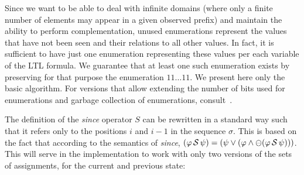 %

Since we want to be able to deal with infinite domains
(where only a finite number of elements may appear in a given observed prefix) and maintain the ability to perform
complementation, unused enumerations represent the
values that have not been seen and their relations
to all other values. 
In fact, it is sufficient to have just one enumeration representing these values per each variable of the LTL formula. 
We guarantee that at least one such enumeration exists by preserving for that purpose the enumeration $11\ldots11$.
We present here only the basic algorithm. For versions that
allow extending the number of bits used for enumerations and garbage collection of enumerations, consult~\cite{HP}.

\iffalse %
The definition of the {\em since} operator $S$ can be rewritten in a standard
way such that it refers only to the positions $i$ and $i-1$ in
the sequence $\sigma$. 
This is based on the
fact that according to the semantics of {\em since},
$(\varphi \, {\cal S} \, \psi) = ( \psi \vee (\varphi \wedge \ominus 
(\varphi \, {\cal S} \, \psi )))$.
This will serve in the
implementation to work with only two versions of
the sets of assignments, for the current and previous state:

